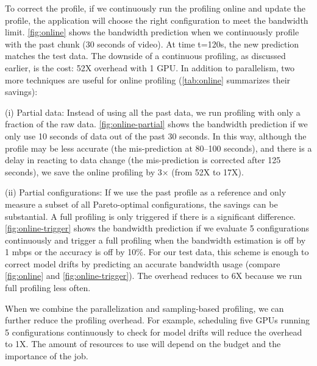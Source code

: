 To correct the profile, if we continuously run the profiling online and update
the profile, the application will choose the right configuration to meet the bandwidth limit.
\autoref{fig:online} shows the bandwidth prediction when we continuously
profile with the past chunk (30 seconds of video). At time t=120s, the new
prediction matches the test data. The downside of a continuous profiling, as
discussed earlier, is the cost: 52X overhead with 1 GPU\@. In addition to
parallelism, two more techniques are useful for online profiling
(\autoref{tab:online} summarizes their savings):

(i) Partial data: Instead of using all the past data, we run profiling with only
a fraction of the raw data.
\autoref{fig:online-partial} shows the bandwidth prediction if we only use 10
seconds of data out of the past 30 seconds. In this way, although the profile
may be less accurate (the mis-prediction at 80--100 seconds), and there is a
delay in reacting to data change (the mis-prediction is corrected after 125
seconds), we save the online profiling by 3$\times$ (from 52X to 17X).

(ii) Partial configurations: If we use the past profile as a reference and only
measure a subset of all Pareto-optimal configurations, the savings can be
substantial. A full profiling is only triggered if there is a significant
difference. \autoref{fig:online-trigger} shows the bandwidth prediction if we
evaluate 5 configurations continuously and trigger a full profiling when the
bandwidth estimation is off by 1 mbps or the accuracy is off by 10\%.
For our test data, this scheme is enough to correct model drifts by predicting an accurate bandwidth usage
(compare \autoref{fig:online} and \autoref{fig:online-trigger}).
The overhead reduces to 6X because we run full profiling less often.

When we combine the parallelization and sampling-based profiling, we can further
reduce the profiling overhead. For example, scheduling five GPUs running 5
configurations continuously to check for model drifts will reduce the overhead
to 1X\@. The amount of resources to use will depend on the budget and the importance
of the job.

